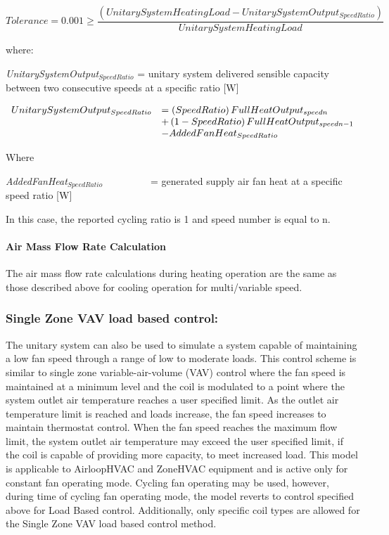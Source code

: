 \begin{equation}
Tolerance = 0.001 \ge \frac{{\left( {UnitarySystemHeatingLoad - UnitarySystemOutpu{t_{SpeedRatio}}} \right)}}{{UnitarySystemHeatingLoad}}
\end{equation}

where:

\emph{UnitarySystemOutput\(_{SpeedRatio}\)} = unitary system delivered sensible capacity between two consecutive speeds at a specific ratio {[}W{]}

\begin{equation}
  \begin{array}{rl}
    UnitarySystemOutput_{SpeedRatio} &= \PB{SpeedRatio} FullHeatOutput_{speedn} \\
                                     &+ \PB{1 - SpeedRatio} FullHeatOutput_{speedn - 1} \\ 
                                     &- AddedFanHeat_{SpeedRatio}
  \end{array}
\end{equation}

Where

\emph{AddedFanHeat\(_{SpeedRatio}\)}~~~~~~~~~ = generated supply air fan heat at a specific speed ratio {[}W{]}

In this case, the reported cycling ratio is 1 and speed number is equal to n.

\paragraph{Air Mass Flow Rate Calculation}\label{air-mass-flow-rate-calculation-1}

The air mass flow rate calculations during heating operation are the same as those described above for cooling operation for multi/variable speed.

\subsubsection{Single Zone VAV load based control:}\label{ashrae-901-load-based-control}

The unitary system can also be used to simulate a system capable of maintaining a low fan speed through a range of low to moderate loads. This control scheme is similar to single zone variable-air-volume (VAV) control where the fan speed is maintained at a minimum level and the coil is modulated to a point where the system outlet air temperature reaches a user specified limit. As the outlet air temperature limit is reached and loads increase, the fan speed increases to maintain thermostat control. When the fan speed reaches the maximum flow limit, the system outlet air temperature may exceed the user specified limit, if the coil is capable of providing more capacity, to meet increased load. This model is applicable to AirloopHVAC and ZoneHVAC equipment and is active only for constant fan operating mode. Cycling fan operating may be used, however, during time of cycling fan operating mode, the model reverts to control specified above for Load Based control. Additionally, only specific coil types are allowed for the Single Zone VAV load based control method. 

